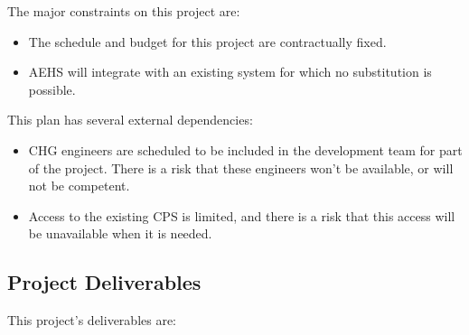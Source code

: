 \documentclass[11pt]{article}
\begin{document}
The major constraints on this project are:

\begin{itemize}
\item The schedule and budget for this project are contractually fixed.
\item AEHS will integrate with an existing system for which no substitution is possible.
\end{itemize}

This plan has several external dependencies:

\begin{itemize}
\item CHG engineers are scheduled to be included in the development team for part of the project.
  There is a risk that these engineers won't be available, or will not be competent.
\item Access to the existing CPS is limited, and there is a risk that this access will be
  unavailable when it is needed.
\end{itemize}

\subsection{Project Deliverables}
\label{deliverables}
This project's deliverables are:
\end{document}

